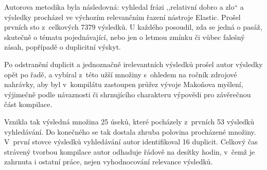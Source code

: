 Autorova metodika byla následovná: vyhledal frázi ,,relativní dobro a zlo`` a
výsledky procházel ve výchozím relevančním řazení nástroje Elastic. Prošel
prvních sto z~celkových 7379 výsledků. U každého posoudil, zda se jedná o
pasáž, skutečně o tématu pojednávající, nebo jen o letmou zmínku či vůbec
falešný zásah, popřípadě o duplicitní výskyt.

Po odstranění duplicit a jednoznačně irelevantních výsledků prošel autor
výsledky opět po řadě, a vybíral z~této užší množiny s~ohledem na ročník zdrojové
nahrávky, aby byl v~kompilátu zastoupen průřez vývoje Makoňova myšlení,
výjimečně podle návaznosti či shrnujícího charakteru výpovědi pro závěrečnou
část kompilace.

Vznikla tak výsledná množina 25 úseků, které pocházely z~prvních 53 výsledků
vyhledávání. Do konečného se tak dostala zhruba polovina procházené množiny. V~první stovce
výsledků vyhledávání autor identifikoval 16 duplicit. Celkový čas strávený tvorbou
kompilace autor odhaduje řádově na desítky hodin, v~čemž je zahrnuta i ostatní
práce, nejen vyhodnocování relevance výsledků.
